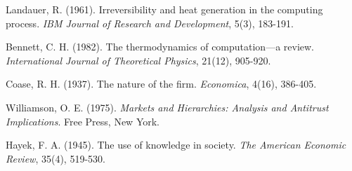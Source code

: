 \documentclass[12pt,a4paper]{article}
\begin{document}
\begin{thebibliography}{99}
 Landauer, R. (1961). Irreversibility and heat generation in the computing process. \textit{IBM Journal of Research and Development}, 5(3), 183-191.

 Bennett, C. H. (1982). The thermodynamics of computation—a review. \textit{International Journal of Theoretical Physics}, 21(12), 905-920.

 Coase, R. H. (1937). The nature of the firm. \textit{Economica}, 4(16), 386-405.

 Williamson, O. E. (1975). \textit{Markets and Hierarchies: Analysis and Antitrust Implications}. Free Press, New York.

 Hayek, F. A. (1945). The use of knowledge in society. \textit{The American Economic Review}, 35(4), 519-530.

\end{thebibliography}
\end{document}
